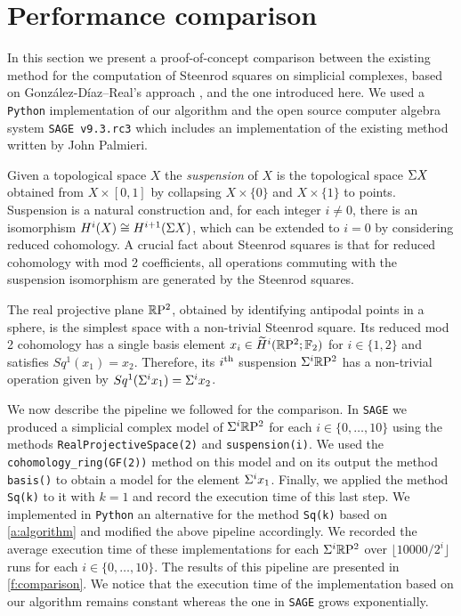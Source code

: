 
\section{Performance comparison} \label{s:comparison}

In this section we present a proof-of-concept comparison between the existing method for the computation of Steenrod squares on simplicial complexes, based on Gonz\'alez-D\'iaz--Real's approach \cite[Corollary 3.2]{gonzalez1999combinatorial}, and the one introduced here.
We used a \verb|Python| implementation of our algorithm and the open source computer algebra system \verb|SAGE v9.3.rc3| \cite{sagemath} which includes an implementation of the existing method written by John Palmieri.

Given a topological space $X$ the \textit{suspension} of $X$ is the topological space $\Sigma X$ obtained from $X \times [0,1]$ by collapsing $X \times \{0\}$ and $X \times \{1\}$ to points.
Suspension is a natural construction and, for each integer $i \neq 0$, there is an isomorphism $H^i(X) \cong H^{i+1}(\Sigma X)$, which can be extended to $i = 0$ by considering reduced cohomology.
A crucial fact about Steenrod squares is that for reduced cohomology with mod 2 coefficients, all operations commuting with the suspension isomorphism are generated by the Steenrod squares.

The real projective plane $\mathbb{R}\mathrm{P}^2$, obtained by identifying antipodal points in a sphere, is the simplest space with a non-trivial Steenrod square.
Its reduced mod 2 cohomology has a single basis element $x_i \in \widetilde{H}^i(\mathbb{R}\mathrm{P}^2; \mathbb{F}_2)$ for $i \in \{1, 2\}$ and satisfies $Sq^1(x_1) = x_2$.
Therefore, its $i^\mathrm{th}$ suspension $\Sigma^i \mathbb{R}\mathrm{P}^2$ has a non-trivial operation given by $Sq^1(\Sigma^i x_1) = \Sigma^i x_2$.

We now describe the pipeline we followed for the comparison.
In \verb|SAGE| we produced a simplicial complex model of $\Sigma^i \mathbb{R}\mathrm{P}^2$ for each $i \in \{0, \dots, 10\}$ using the methods \verb|RealProjectiveSpace(2)| and \verb|suspension(i)|.
We used the \verb|cohomology_ring(GF(2))| method on this model and on its output the method \verb|basis()| to obtain a model for the element $\Sigma^i x_1$.
Finally, we applied the method \verb|Sq(k)| to it with $k=1$ and record the execution time of this last step.
We implemented in \verb|Python| an alternative for the method \verb|Sq(k)| based on \cref{a:algorithm} and modified the above pipeline accordingly.
We recorded the average execution time of these implementations for each $\Sigma^i \mathbb{R}\mathrm{P}^2$ over $\lfloor 10000/2^i \rfloor$ runs for each $i \in \{0, \dots, 10\}$.
The results of this pipeline are presented in \cref{f:comparison}.
We notice that the execution time of the implementation based on our algorithm remains constant whereas the one in \verb|SAGE| grows exponentially.

